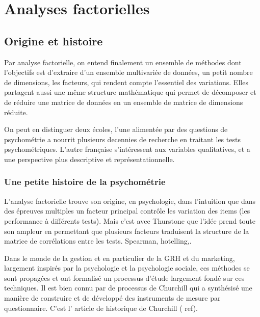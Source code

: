 \documentclass[
]{book}
\begin{document}
\hypertarget{analyses-factorielles}{%
\chapter{Analyses factorielles}\label{analyses-factorielles}}

\hypertarget{origine-et-histoire}{%
\section{Origine et histoire}\label{origine-et-histoire}}

Par analyse factorielle, on entend finalement un ensemble de méthodes dont l'objectifs est d'extraire d'un ensemble multivariée de données, un petit nombre de dimensions, les facteurs, qui rendent compte l'essentiel des variations. Elles partagent aussi une même structure mathématique qui permet de décomposer et de réduire une matrice de données en un ensemble de matrice de dimensions réduite.

On peut en distinguer deux écoles, l'une alimentée par des questions de psychométrie a nourrit plusieurs decennies de recherche en traitant les tests psychométriques. L'autre française s'intéressent aux variables qualitatives, et a une perspective plus descriptive et représentationnelle.

\hypertarget{une-petite-histoire-de-la-psychomuxe9trie}{%
\subsection{Une petite histoire de la psychométrie}\label{une-petite-histoire-de-la-psychomuxe9trie}}

L'analyse factorielle trouve son origine, en psychologie, dans l'intuition que dans des épreuves multiples un facteur principal contrôle les variation des items (les performance à différents tests). Mais c'est avec Thurstone que l'idée prend toute son ampleur en permettant que plusieurs facteurs traduisent la structure de la matrice de corrélations entre les tests. Spearman, hotelling,.

Dans le monde de la gestion et en particulier de la GRH et du marketing, largement inspirés par la psychologie et la psychologie sociale, ces méthodes se sont propagées et ont formalisé un processus d'étude largement fondé sur ces techniques. Il est bien connu par de processus de Churchill qui a synthésisé une manière de construire et de développé des instruments de mesure par questionnaire. C'est l' article de historique de Churchill ( ref).
\end{document}
